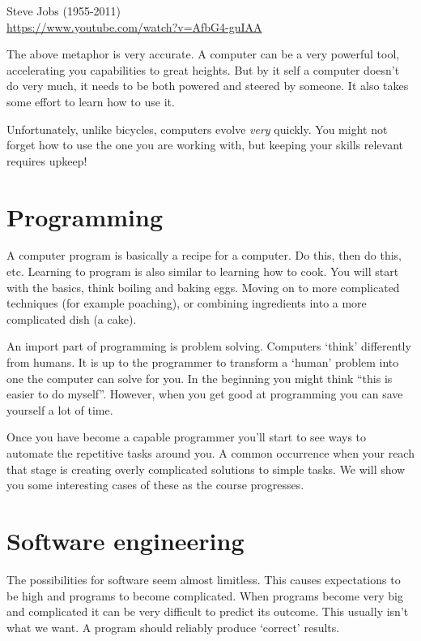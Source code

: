 	\hfill Steve Jobs (1955-2011)\\
	
	\url{https://www.youtube.com/watch?v=AfbG4-guIAA}
	
	The above metaphor is very accurate.
	A computer can be a very powerful tool, accelerating you capabilities to great heights. 
	But by it self a computer doesn't do very much, it needs to be both powered and steered by someone.
	It also takes some effort to learn how to use it.
	
	Unfortunately, unlike bicycles, computers evolve \emph{very} quickly. 
	You might not forget how to use the one you are working with, but keeping your skills relevant requires upkeep!

	\section{Programming}
	
	A computer program is basically a recipe for a computer.
	Do this, then do this, etc.
	Learning to program is also similar to learning how to cook.
	You will start with the basics, think boiling and baking eggs.
	Moving on to more complicated techniques (for example poaching), or combining ingredients into a more complicated dish (a cake).
	
	An import part of programming is problem solving.
	Computers `think' differently from humans.
	It is up to the programmer to transform a `human' problem into one the computer can solve for you.
	In the beginning you might think ``this is easier to do myself''.
	However, when you get good at programming you can save yourself a lot of time.
	
	Once you have become a capable programmer you'll start to see ways to automate the repetitive tasks around you.
	A common occurrence when your reach that stage is creating overly complicated solutions to simple tasks.
	We will show you some interesting cases of these as the course progresses.

	\section{Software engineering}
	
	The possibilities for software seem almost limitless.
	This causes expectations to be high and programs to become complicated.
	When programs become very big and complicated it can be very difficult to predict its outcome.
	This usually isn't what we want.
	A program should reliably produce `correct' results.
	

